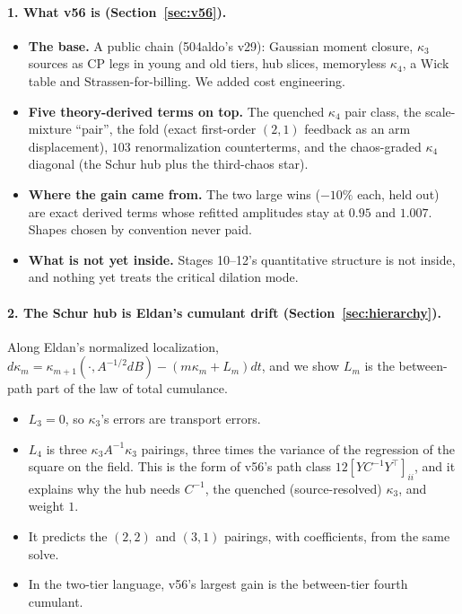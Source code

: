 \label{sec:summary}
\paragraph{1. What v56 is (Section~\ref{sec:v56}).}
\begin{itemize}[leftmargin=*]
\item \textbf{The base.} A public chain (504aldo's v29): Gaussian moment closure, $\kappa_3$ sources as CP legs in young and old tiers,
hub slices, memoryless $\kappa_4$, a Wick table and Strassen-for-billing. We added cost engineering.
\item \textbf{Five theory-derived terms on top.} The quenched $\kappa_4$ pair class, the scale-mixture ``pair'', the fold (exact
first-order $(2,1)$ feedback as an arm displacement), $103$ renormalization counterterms, and the chaos-graded $\kappa_4$
diagonal (the Schur hub plus the third-chaos star).
\item \textbf{Where the gain came from.} The two large wins ($-10\%$ each, held out) are exact derived terms whose refitted amplitudes stay
at $0.95$ and $1.007$. Shapes chosen by convention never paid.
\item \textbf{What is not yet inside.} Stages 10--12's quantitative structure is not inside, and nothing yet treats the critical
dilation mode.
\end{itemize}

\paragraph{2. The Schur hub is Eldan's cumulant drift (Section~\ref{sec:hierarchy}).} Along Eldan's normalized localization,
$d\kappa_m=\kappa_{m+1}(\cdot,A^{-1/2}dB)-(m\kappa_m+L_m)dt$, and we show $L_m$ is the between-path part of the law of total cumulance.
\begin{itemize}[leftmargin=*]
\item $L_3=0$, so $\kappa_3$'s errors are transport errors.
\item $L_4$ is three $\kappa_3A^{-1}\kappa_3$ pairings, three times the variance of the regression of the square on the field. This is the
form of v56's path class $12[YC^{-1}Y^\top]_{ii}$, and it explains why the hub needs $C^{-1}$, the quenched (source-resolved) $\kappa_3$, and
weight $1$.
\item It predicts the $(2,2)$ and $(3,1)$ pairings, with coefficients, from the same solve.
\item In the two-tier language, v56's largest gain is the between-tier fourth cumulant.
\end{itemize}

